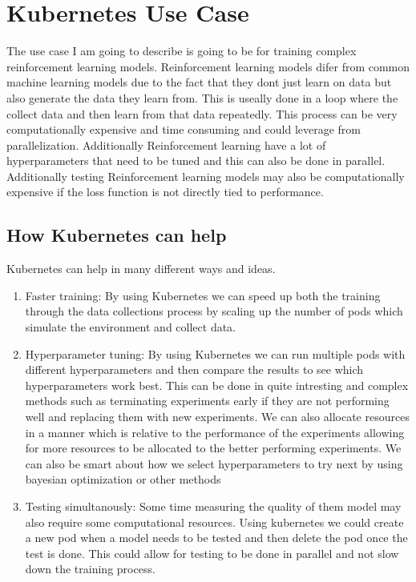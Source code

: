 \documentclass[12pt]{Article}
\begin{document}
\section{Kubernetes Use Case}
The use case I am going to describe is going to be for training complex reinforcement learning models.
Reinforcement learning models difer from common machine learning models due to the fact that they dont just learn on data but also generate the data they learn from.
This is useally done in a loop where the collect data and then learn from that data repeatedly.
This process can be very computationally expensive and time consuming and could leverage from parallelization.
Additionally Reinforcement learning have a lot of hyperparameters that need to be tuned and this can also be done in parallel.
Additionally testing Reinforcement learning models may also be computationally expensive if the loss function is not directly tied to performance.

\subsection{How Kubernetes can help}
Kubernetes can help in many different ways and ideas.

\begin{enumerate}
  \item Faster training:
  By using Kubernetes we can speed up both the training through the data collections process by scaling up the number of pods which simulate the environment and collect data.

  \item Hyperparameter tuning:
  By using Kubernetes we can run multiple pods with different hyperparameters and then compare the results to see which hyperparameters work best.
  This can be done in quite intresting and complex methods such as terminating experiments early if they are not performing well and replacing them with new experiments.
  We can also allocate resources in a manner which is relative to the performance of the experiments allowing for more resources to be allocated to the better performing experiments.
  We can also be smart about how we select hyperparameters to try next by using bayesian optimization or other methods

  \item Testing simultanously:
  Some time measuring the quality of them model may also require some computational resources.
  Using kubernetes we could create a new pod when a model needs to be tested and then delete the pod once the test is done.
  This could allow for testing to be done in parallel and not slow down the training process.
\end{enumerate}
\end{document}

